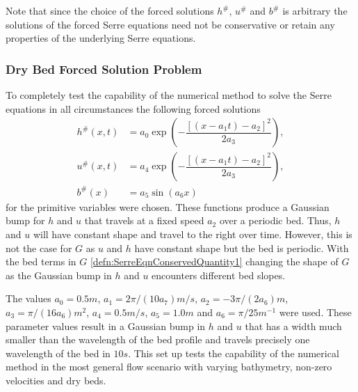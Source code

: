 \documentclass[times]{elsarticle}
\begin{document}
Note that since the choice of the forced solutions $h^\#$, $u^\#$ and $b^\#$ is arbitrary the solutions of the forced Serre equations need not be conservative or retain any properties of the underlying Serre equations. 

\subsubsection{Dry Bed Forced Solution Problem}
To completely test the capability of the numerical method to solve the Serre equations in all circumstances the following forced solutions
\begin{subequations}
	\begin{align}
	\label{eqn:ForcedSolutionxt}
	h^\#(x,t) &=  a_0 \exp\left(-\dfrac{\left[\left(x - a_1 t\right) - a_2\right]^2}{2 a_3}\right), \\
	u^\#(x,t) &= a_4 \exp\left(-\dfrac{\left[\left(x - a_1 t\right) - a_2\right]^2}{2 a_3}\right), \\
	b^\#(x) &= a_5 \sin\left(a_6 x\right)
	\end{align}
\end{subequations}
for the primitive variables were chosen. These functions produce a Gaussian bump for $h$ and $u$ that travels at a fixed speed $a_2$ over a periodic bed. Thus, $h$ and $u$ will have constant shape and travel to the right over time. However, this is not the case for $G$ as $u$ and $h$ have constant shape but the bed is periodic. With the bed terms in $G$ \eqref{defn:SerreEqnConservedQuantity1} changing the shape of $G$ as the Gaussian bump in $h$ and $u$ encounters different bed slopes.

The values $a_0 = 0.5m$, $a_1 = 2 \pi / \left(10 a_7\right) m/s$, $a_2 =- 3\pi/ \left(2 a_6\right)m$, $a_3 = \pi / (16 a_6) m^2$, $a_4 = 0.5 m/s$, $a_5 = 1.0 m$ and $a_6 = \pi / 25 m^{-1}$ were used. These parameter values result in a Gaussian bump in $h$ and $u$ that has a width much smaller than the wavelength of the bed profile and travels precisely one wavelength of the bed in $10s$. This set up tests the capability of the numerical method in the most general flow scenario with varying bathymetry, non-zero velocities and dry beds. 
\end{document}
